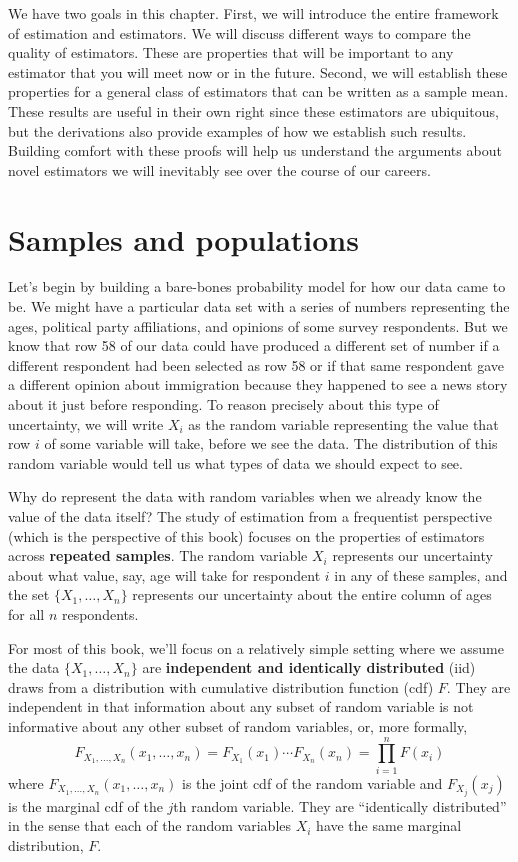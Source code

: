 \documentclass[
  letterpaper,
  DIV=11,
  numbers=noendperiod]{scrreprt}
\theoremstyle{definition}
\theoremstyle{definition}
\theoremstyle{plain}
\theoremstyle{remark}
\begin{document}
We have two goals in this chapter. First, we will introduce the entire
framework of estimation and estimators. We will discuss different ways
to compare the quality of estimators. These are properties that will be
important to any estimator that you will meet now or in the future.
Second, we will establish these properties for a general class of
estimators that can be written as a sample mean. These results are
useful in their own right since these estimators are ubiquitous, but the
derivations also provide examples of how we establish such results.
Building comfort with these proofs will help us understand the arguments
about novel estimators we will inevitably see over the course of our
careers.

\hypertarget{samples-and-populations}{%
\section{Samples and populations}\label{samples-and-populations}}

Let's begin by building a bare-bones probability model for how our data
came to be. We might have a particular data set with a series of numbers
representing the ages, political party affiliations, and opinions of
some survey respondents. But we know that row 58 of our data could have
produced a different set of number if a different respondent had been
selected as row 58 or if that same respondent gave a different opinion
about immigration because they happened to see a news story about it
just before responding. To reason precisely about this type of
uncertainty, we will write \(X_i\) as the random variable representing
the value that row \(i\) of some variable will take, before we see the
data. The distribution of this random variable would tell us what types
of data we should expect to see.

Why do represent the data with random variables when we already know the
value of the data itself? The study of estimation from a frequentist
perspective (which is the perspective of this book) focuses on the
properties of estimators across \textbf{repeated samples}. The random
variable \(X_i\) represents our uncertainty about what value, say, age
will take for respondent \(i\) in any of these samples, and the set
\(\{X_{1}, \ldots, X_{n}\}\) represents our uncertainty about the entire
column of ages for all \(n\) respondents.

For most of this book, we'll focus on a relatively simple setting where
we assume the data \(\{X_1, \ldots, X_n\}\) are \textbf{independent and
identically distributed} (iid) draws from a distribution with cumulative
distribution function (cdf) \(F\). They are independent in that
information about any subset of random variable is not informative about
any other subset of random variables, or, more formally, \[
F_{X_{1},\ldots,X_{n}}(x_{1}, \ldots, x_{n}) = F_{X_{1}}(x_{1})\cdots F_{X_{n}}(x_{n}) = \prod_{i=1}^n F(x_i)
\] where \(F_{X_{1},\ldots,X_{n}}(x_{1}, \ldots, x_{n})\) is the joint
cdf of the random variable and \(F_{X_{j}}(x_{j})\) is the marginal cdf
of the \(j\)th random variable. They are ``identically distributed'' in
the sense that each of the random variables \(X_i\) have the same
marginal distribution, \(F\).
\end{document}
